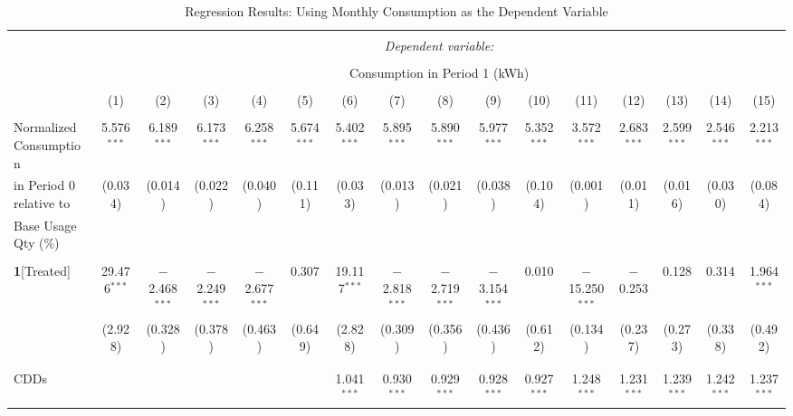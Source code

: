 \begin{table}[!htbp] \centering 
\caption{Regression Results: Using Monthly Consumption as the Dependent Variable} 
\label{Table:Regression-Results_Monthly} 
\small 

\begin{adjustbox}{scale = 0.8}

\begin{tabular}{@{\extracolsep{-7pt}}lccccccccccccccc} 
\\[-1.8ex]\hline 
\hline \\[-1.8ex] 
 & \multicolumn{15}{c}{\textit{Dependent variable:}} \\ 
\cline{2-16} 
\\[-1.8ex] & \multicolumn{15}{c}{Consumption in Period 1 (kWh)} \\ 
\\[-1.8ex] & (1) & (2) & (3) & (4) & (5) & (6) & (7) & (8) & (9) & (10) & (11) & (12) & (13) & (14) & (15)\\ 
\hline \\[-1.8ex] 
 Normalized Consumption & 5.576$^{***}$ & 6.189$^{***}$ & 6.173$^{***}$ & 6.258$^{***}$ & 5.674$^{***}$ & 5.402$^{***}$ & 5.895$^{***}$ & 5.890$^{***}$ & 5.977$^{***}$ & 5.352$^{***}$ & 3.572$^{***}$ & 2.683$^{***}$ & 2.599$^{***}$ & 2.546$^{***}$ & 2.213$^{***}$ \\ 
 in Period 0 relative to & (0.034) & (0.014) & (0.022) & (0.040) & (0.111) & (0.033) & (0.013) & (0.021) & (0.038) & (0.104) & (0.001) & (0.011) & (0.016) & (0.030) & (0.084) \\ 
 Base Usage Qty (\%)  & & & & & & & & & & & & & & & \\
  & & & & & & & & & & & & & & & \\ 
 \textbf{1}[Treated] & 29.476$^{***}$ & $-$2.468$^{***}$ & $-$2.249$^{***}$ & $-$2.677$^{***}$ & 0.307 & 19.117$^{***}$ & $-$2.818$^{***}$ & $-$2.719$^{***}$ & $-$3.154$^{***}$ & 0.010 & $-$15.250$^{***}$ & $-$0.253 & 0.128 & 0.314 & 1.964$^{***}$ \\ 
  & (2.928) & (0.328) & (0.378) & (0.463) & (0.649) & (2.828) & (0.309) & (0.356) & (0.436) & (0.612) & (0.134) & (0.237) & (0.273) & (0.338) & (0.492) \\ 
  & & & & & & & & & & & & & & & \\
  & & & & & & & & & & & & & & & \\
 CDDs &  &  &  &  &  & 1.041$^{***}$ & 0.930$^{***}$ & 0.929$^{***}$ & 0.928$^{***}$ & 0.927$^{***}$ & 1.248$^{***}$ & 1.231$^{***}$ & 1.239$^{***}$ & 1.242$^{***}$ & 1.237$^{***}$ \\ 

\end{tabular}
\end{adjustbox}
\end{table}
